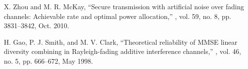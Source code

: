 \documentclass[journal]{IEEEtran}
\begin{document}
\begin{thebibliography}{1}

X. Zhou and M. R. McKay,
\newblock ``Secure transmission with artificial noise over fading channels: Achievable rate and optimal power allocation,''
, vol. 59, no. 8, pp. 3831--3842, Oct. 2010.

H. Gao, P. J. Smith, and M. V. Clark,
\newblock ``Theoretical reliability of MMSE linear diversity combining in Rayleigh-fading additive interference channels,''
, vol. 46, no. 5, pp. 666--672, May 1998.

\end{thebibliography}
\end{document}
